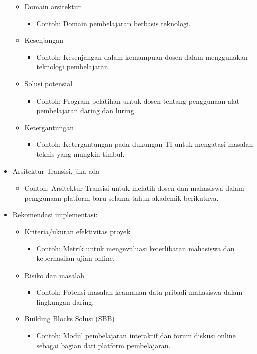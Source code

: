 \begin{itemize}
\begin{itemize}
		\item Domain arsitektur
		\begin{itemize}
			\item Contoh: Domain pembelajaran berbasis teknologi.
		\end{itemize}
		\item Kesenjangan
		\begin{itemize}
			\item Contoh: Kesenjangan dalam kemampuan dosen dalam menggunakan teknologi pembelajaran.
		\end{itemize}
		\item Solusi potensial
		\begin{itemize}
			\item Contoh: Program pelatihan untuk dosen tentang penggunaan alat pembelajaran daring dan luring.
		\end{itemize}
		\item Ketergantungan
		\begin{itemize}
			\item Contoh: Ketergantungan pada dukungan TI untuk mengatasi masalah teknis yang mungkin timbul.
		\end{itemize}
	\end{itemize}
	\item Arsitektur Transisi, jika ada
	\begin{itemize}
		\item Contoh: Arsitektur Transisi untuk melatih dosen dan mahasiswa dalam penggunaan platform baru selama tahun akademik berikutnya.
	\end{itemize}
	\item Rekomendasi implementasi:
	\begin{itemize}
		\item Kriteria/ukuran efektivitas proyek
		\begin{itemize}
			\item Contoh: Metrik untuk mengevaluasi keterlibatan mahasiswa dan keberhasilan ujian online.
		\end{itemize}
		\item Risiko dan masalah
		\begin{itemize}
			\item Contoh: Potensi masalah keamanan data pribadi mahasiswa dalam lingkungan daring.
		\end{itemize}
		\item Building Blocks Solusi (SBB)
		\begin{itemize}
			\item Contoh: Modul pembelajaran interaktif dan forum diskusi online sebagai bagian dari platform pembelajaran.
		\end{itemize}
	\end{itemize}
\end{itemize}


